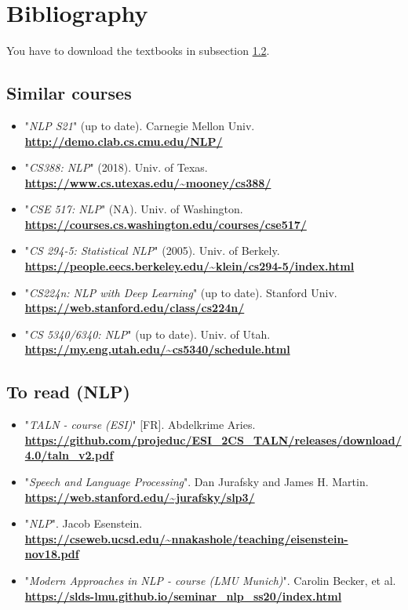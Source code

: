 \documentclass[11pt, a4paper]{article}
\newcommand{\kurl}[1]{{\scriptsize\bfseries\url{#1}}}
\begin{document}
\section{Bibliography}

You have to download the textbooks in subsection \ref{sec:txtbk}.

\subsection{Similar courses}

\begin{itemize}
	\item "\textit{NLP S21}" (up to date).
	Carnegie Mellon Univ. 
	\kurl{http://demo.clab.cs.cmu.edu/NLP/}
	
	\item "\textit{CS388: NLP}" (2018). 
	Univ. of Texas. 
	\kurl{https://www.cs.utexas.edu/~mooney/cs388/}
	
	\item "\textit{CSE 517: NLP}" (NA).
	Univ. of Washington.
	\kurl{https://courses.cs.washington.edu/courses/cse517/}
	
	\item "\textit{CS 294-5: Statistical NLP}" (2005). 
	Univ. of Berkely. 
	\kurl{https://people.eecs.berkeley.edu/~klein/cs294-5/index.html}
	
	\item "\textit{CS224n: NLP with Deep Learning}" (up to date).
	Stanford Univ.
	\kurl{https://web.stanford.edu/class/cs224n/}
	
	\item "\textit{CS 5340/6340: NLP}" (up to date). 
	Univ. of Utah.
	\kurl{https://my.eng.utah.edu/~cs5340/schedule.html}
\end{itemize}

\subsection{To read (NLP)}
\label{sec:txtbk}

\begin{itemize}
	\item "\textit{TALN - course (ESI)}" [FR].
	Abdelkrime Aries. 
	\kurl{https://github.com/projeduc/ESI_2CS_TALN/releases/download/4.0/taln_v2.pdf}
	
	
	\item "\textit{Speech and Language Processing}".
	Dan Jurafsky and James H. Martin.
	\kurl{https://web.stanford.edu/~jurafsky/slp3/}
	
	\item "\textit{NLP}".
	Jacob Esenstein.
	\kurl{https://cseweb.ucsd.edu/~nnakashole/teaching/eisenstein-nov18.pdf}
	
	\item "\textit{Modern Approaches in NLP - course (LMU Munich)}".
	Carolin Becker, et al.
	\kurl{https://slds-lmu.github.io/seminar_nlp_ss20/index.html}
\end{itemize}
\end{document}

